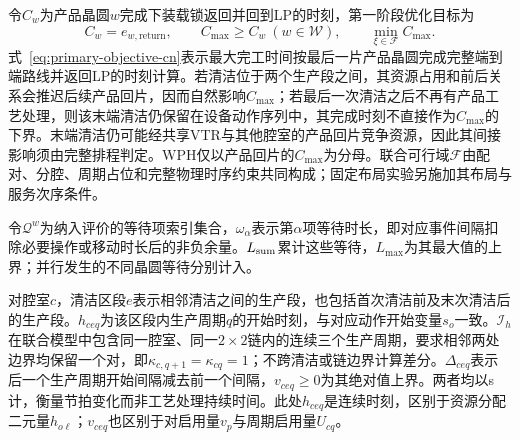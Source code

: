 \documentclass[final,5p,times,twocolumn]{elsarticle}
\begin{document}
令$C_w$为产品晶圆$w$完成下装载锁返回并回到LP的时刻，第一阶段优化目标为
\begin{equation}
C_w=e_{w,\mathrm{return}},\qquad
C_{\max}\ge C_w\ (w\in\mathcal W),\qquad
\min_{\xi\in\mathcal F}C_{\max}.
\label{eq:primary-objective-cn}
\end{equation}
式~\eqref{eq:primary-objective-cn}表示最大完工时间按最后一片产品晶圆完成完整端到端路线并返回LP的时刻计算。若清洁位于两个生产段之间，其资源占用和前后关系会推迟后续产品回片，因而自然影响$C_{\max}$；若最后一次清洁之后不再有产品工艺处理，则该末端清洁仍保留在设备动作序列中，其完成时刻不直接作为$C_{\max}$的下界。末端清洁仍可能经共享VTR与其他腔室的产品回片竞争资源，因此其间接影响须由完整排程判定。WPH仅以产品回片的$C_{\max}$为分母。联合可行域$\mathcal F$由配对、分腔、周期占位和完整物理时序约束共同构成；固定布局实验另施加其布局与服务次序条件。

令$\mathcal Q^w$为纳入评价的等待项索引集合，$\omega_\alpha$表示第$\alpha$项等待时长，即对应事件间隔扣除必要操作或移动时长后的非负余量。$L_{\rm sum}$累计这些等待，$L_{\max}$为其最大值的上界；并行发生的不同晶圆等待分别计入。

对腔室$c$，清洁区段$e$表示相邻清洁之间的生产段，也包括首次清洁前及末次清洁后的生产段。$h_{ceq}$为该区段内生产周期$q$的开始时刻，与对应动作开始变量$s_o$一致。$\mathcal I_h$在联合模型中包含同一腔室、同一$2\times2$链内的连续三个生产周期，要求相邻两处边界均保留一个对，即$\kappa_{c,q+1}=\kappa_{cq}=1$；不跨清洁或链边界计算差分。$\Delta_{ceq}$表示后一个生产周期开始间隔减去前一个间隔，$v_{ceq}\ge0$为其绝对值上界。两者均以s计，衡量节拍变化而非工艺处理持续时间。此处$h_{ceq}$是连续时刻，区别于资源分配二元量$h_{o\ell}$；$v_{ceq}$也区别于对启用量$v_p$与周期启用量$U_{cq}$。
\end{document}
